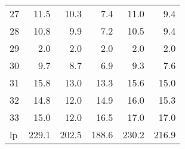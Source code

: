 \begin{tabular}{lrrrrr}
     27 &  11.5 &  10.3 &   7.4 &  11.0 &   9.4 \\
     28 &  10.8 &   9.9 &   7.2 &  10.5 &   9.4 \\
     29 &   2.0 &   2.0 &   2.0 &   2.0 &   2.0 \\
     30 &   9.7 &   8.7 &   6.9 &   9.3 &   7.6 \\
     31 &  15.8 &  13.0 &  13.3 &  15.6 &  15.0 \\
     32 &  14.8 &  12.0 &  14.9 &  16.0 &  15.3 \\
     33 &  15.0 &  12.0 &  16.5 &  17.0 &  17.0 \\
     lp & 229.1 & 202.5 & 188.6 & 230.2 & 216.9 \\
\bottomrule
\end{tabular}
